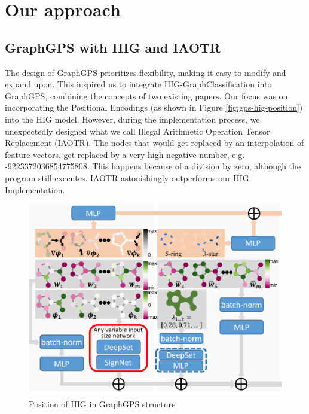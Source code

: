 \section{Our approach}
\subsection{GraphGPS with HIG and IAOTR}
\label{sec:graphgps_hig}
The design of GraphGPS prioritizes flexibility, making it easy to modify and expand upon. This inspired us to integrate HIG-GraphClassification into GraphGPS, combining the concepts of two existing papers. Our focus was on incorporating the Positional Encodings (as shown in Figure \autoref{fig:gps-hig-position}) into the HIG model. However, during the implementation process, we unexpectedly designed what we call Illegal Arithmetic Operation Tensor Replacement (IAOTR). The nodes that would get replaced by an interpolation of feature vectors, get replaced by a very high negative number, e.g. -9223372036854775808. This happens because of a division by zero, although the program still executes. IAOTR astonishingly outperforms our HIG-Implementation.

\begin{figure}[!ht]
    \centering
    \includegraphics[scale=0.2]{tex/res/gps_hig_position.png}
    \caption{Position of HIG in GraphGPS structure}
    \label{fig:gps-hig-position}
\end{figure}

